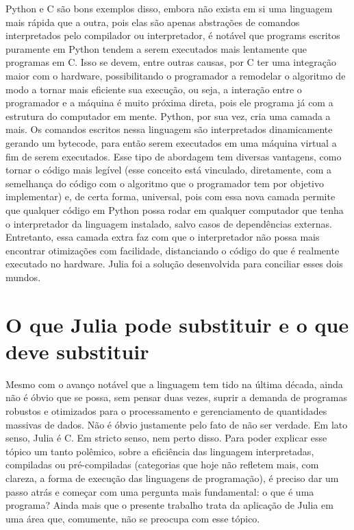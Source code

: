 Python e C são bons exemplos disso, embora não exista em si uma linguagem mais rápida que a outra, pois elas são apenas abstrações de comandos interpretados pelo compilador ou interpretador, é notável que programs escritos puramente em Python tendem a serem executados mais lentamente que programas em C. Isso se devem, entre outras causas, por C ter uma integração maior com o hardware, possibilitando o programador a remodelar o algoritmo de modo a tornar mais eficiente sua execução, ou seja, a interação entre o programador e a máquina é muito próxima direta, pois ele programa já com a estrutura do computador em mente. Python, por sua vez, cria uma camada a mais. Os comandos escritos nessa linguagem são interpretados dinamicamente gerando um bytecode, para então serem executados em uma máquina virtual a fim de serem executados. Esse tipo de abordagem tem diversas vantagens, como tornar o código mais legível (esse conceito está vinculado, diretamente, com a semelhança do código com o algoritmo que o programador tem por objetivo implementar) e, de certa forma, universal, pois com essa nova camada permite que qualquer código em Python possa rodar em qualquer computador que tenha o interpretador da linguagem instalado, salvo casos de dependências externas. Entretanto, essa camada extra faz com que o interpretador não possa mais encontrar otimizações com facilidade, distanciando o código do que é realmente executado no hardware. Julia foi a solução desenvolvida para conciliar esses dois mundos.

\section{O que Julia pode substituir e o que deve substituir}

Mesmo com o avanço notável que a linguagem tem tido na última década, ainda não é óbvio que se possa, sem pensar duas vezes, suprir a demanda de programas robustos e otimizados para o processamento e gerenciamento de quantidades massivas de dados. Não é óbvio justamente pelo fato de não ser verdade. Em lato senso, Julia é C. Em stricto senso, nem perto disso. Para poder explicar esse tópico um tanto polêmico, sobre a eficiência das linguagem interpretadas, compiladas ou pré-compiladas (categorias que hoje não refletem mais, com clareza, a forma de execução das linguagens de programação), é preciso dar um passo atrás e começar com uma pergunta mais fundamental: o que é uma programa? Ainda mais que o presente trabalho trata da aplicação de Julia em uma área que, comumente, não se preocupa com esse tópico.

